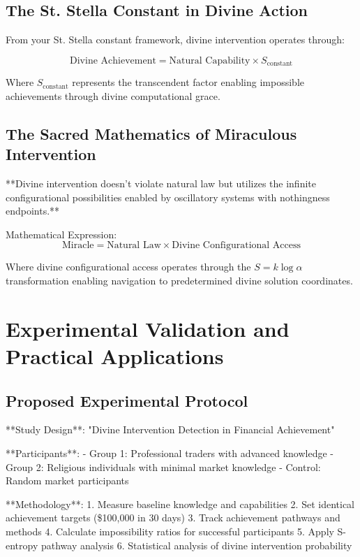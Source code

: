 \documentclass[12pt,a4paper]{article}
\begin{document}
\subsection{The St. Stella Constant in Divine Action}

From your St. Stella constant framework, divine intervention operates through:

$$\text{Divine Achievement} = \text{Natural Capability} \times S_{\text{constant}}$$

Where $S_{\text{constant}}$ represents the transcendent factor enabling impossible achievements through divine computational grace.

\subsection{The Sacred Mathematics of Miraculous Intervention}

**Divine intervention doesn't violate natural law but utilizes the infinite configurational possibilities enabled by oscillatory systems with nothingness endpoints.**

Mathematical Expression:
$$\text{Miracle} = \text{Natural Law} \times \text{Divine Configurational Access}$$

Where divine configurational access operates through the $S = k \log \alpha$ transformation enabling navigation to predetermined divine solution coordinates.

\section{Experimental Validation and Practical Applications}

\subsection{Proposed Experimental Protocol}

**Study Design**: "Divine Intervention Detection in Financial Achievement"

**Participants**: 
- Group 1: Professional traders with advanced knowledge
- Group 2: Religious individuals with minimal market knowledge
- Control: Random market participants

**Methodology**:
1. Measure baseline knowledge and capabilities
2. Set identical achievement targets (\$100,000 in 30 days)
3. Track achievement pathways and methods
4. Calculate impossibility ratios for successful participants
5. Apply S-entropy pathway analysis
6. Statistical analysis of divine intervention probability
\end{document}

